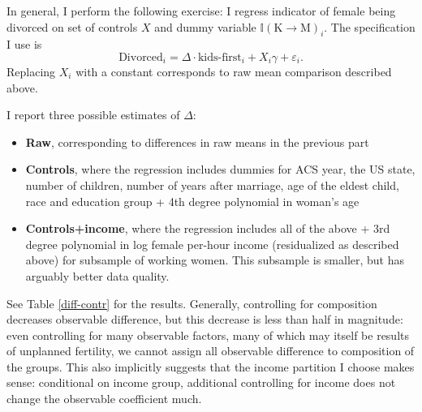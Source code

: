 \documentclass[12pt,letter]{article}
\newcommand{\I}{\mathbb{I}}
\begin{document}
In general, I perform the following exercise: I regress indicator of female being divorced on set of controls $X$ and dummy variable $\I(\text{K$\to$M})_i$. The specification I use is
\[\text{Divorced}_i = \Delta \cdot \text{kids-first}_i + X_i\gamma + \varepsilon_i.\]
Replacing $X_i$ with a constant corresponds to raw mean comparison described above. 

I report three possible estimates of $\Delta$:
\begin{itemize}
\item \textbf{Raw}, corresponding to differences in raw means in the previous part
\item \textbf{Controls}, where the regression includes dummies for ACS year, the US state, number of children, number of years after marriage, age of the eldest child, race and education group + 4th degree polynomial in woman's age
\item \textbf{Controls+income}, where the regression includes all of the above + 3rd degree polynomial in log female per-hour income (residualized as described above) for subsample of working women. This subsample is smaller, but has arguably better data quality.
\end{itemize}

See Table \ref{diff-contr} for the results. Generally, controlling for composition decreases observable difference, but this decrease is less than half in magnitude: even controlling for many observable factors, many of which may itself be results of unplanned fertility, we cannot assign all observable difference to composition of the groups. This also implicitly suggests that the income partition I choose makes sense: conditional on income group, additional controlling for income does not change the observable coefficient much. 
\end{document}
